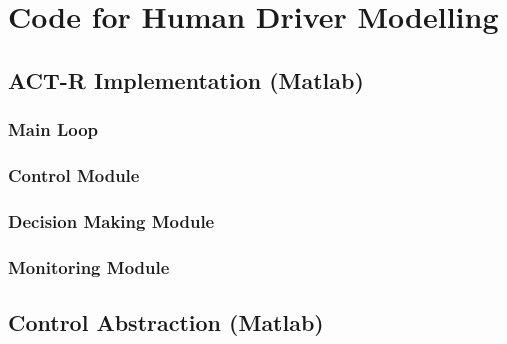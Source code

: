 \chapter{Code for Human Driver Modelling}

\section{ACT-R Implementation (Matlab)}
\label{sec:appendix_cont}

\subsection{Main Loop}



\subsection{Control Module}



\subsection{Decision Making Module}



\subsection{Monitoring Module}



\section{Control Abstraction (Matlab)}
\label{sec:control_abs}







